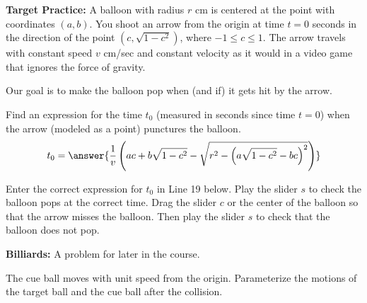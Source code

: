 \documentclass{ximera}
\begin{document}
\begin{example} {\bf Target Practice:}
A balloon with radius $r$ cm is centered at the point with coordinates $(a,b)$. You shoot an arrow from the origin at time $t=0$ seconds in the direction of the point $(c, \sqrt{1-c^2})$, where $-1\leq c \leq 1$. The arrow travels with constant speed $v$ cm/sec and constant velocity as it would in a video game that ignores the force of gravity. 

Our goal is to make the balloon pop when (and if) it gets hit by the arrow. 
\end{example}


\begin{question}

Find an expression for the time $t_0$ (measured in seconds since time $t=0$) when the arrow (modeled as a point) punctures the balloon. 
\[
   t_0 = \answer{\frac{1}{v} \left( a c + b \sqrt{1-c^2}-\sqrt{r^2 - \left( a \sqrt{1-c^2} - b c \right)^2}\right)}
\]

\end{question}

\begin{exploration}\label{exp:pc1c}
Enter the correct expression for $t_0$ in Line 19 below. Play the slider $s$ to check the balloon pops at the correct time. Drag the slider $c$ or the center of the balloon so that the arrow misses the balloon. Then play the slider $s$ to check that the balloon does not pop.

 
\begin{onlineOnly}
    \begin{center}
\end{center}
\end{onlineOnly}
\end{exploration}




\begin{example} {\bf Billiards:}
A problem for later in the course. 
\end{example}


\begin{question}
The cue ball moves with unit speed from the origin. Parameterize the motions of the target ball and the cue ball after the collision.
\end{question}
\end{document}
